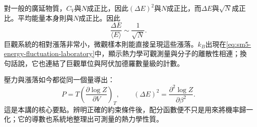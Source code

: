 對一般的廣延物質，\(C_V\)與\(N\)成正比，因此\((\Delta E)^2\)與\(N\)成正比，而\(\Delta E\)與\(\sqrt{N}\)成正比。平均能量本身則與\(N\)成正比。因此
\begin{equation}
 \frac{\Delta E}{\langle E\rangle}\sim\frac{1}{\sqrt{N}}.
 \label{eq:sm5-relative-fluctuation-scaling}
\end{equation}
巨觀系統的相對漲落非常小，微觀樣本則能直接呈現這些漲落。\(k_B\)出現在\eqref{eq:sm5-energy-fluctuation-laboratory}中，顯示熱力學可觀測量與分子的離散性相連；換句話說，它也連結了巨觀單位與阿伏加德羅數量級的計數。

壓力與漲落如今都從同一個量導出：
\[
 P=T\left(\frac{\partial\log Z}{\partial V}\right)_T,
 \qquad
 (\Delta E)^2=\frac{\partial^2\log Z}{\partial\beta^2}.
\]
這是本講的核心要點。辨明正確的約束條件後，配分函數便不只是用來將機率歸一化；它的導數也系統地整理出可測量的熱力學性質。